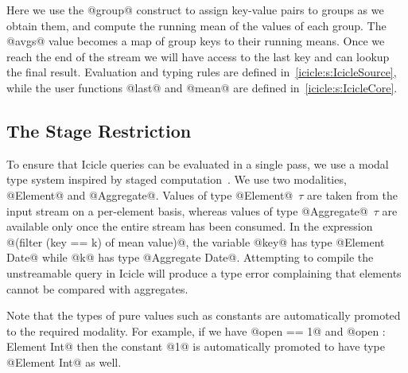 Here we use the @group@ construct to assign key-value pairs to groups as we obtain them, and compute the running mean of the values of each group. The @avgs@ value becomes a map of group keys to their running means. Once we reach the end of the stream we will have access to the last key and can lookup the final result.
Evaluation and typing rules are defined in~\cref{icicle:s:IcicleSource}, while the user functions @last@ and @mean@ are defined in~\cref{icicle:s:IcicleCore}.


\subsection{The Stage Restriction}
To ensure that Icicle queries can be evaluated in a single pass, we use a modal type system inspired by staged computation~\cite{davies2001modal}. We use two modalities, @Element@ and @Aggregate@. Values of type @Element@~$\tau$ are taken from the input stream on a per-element basis, whereas values of type @Aggregate@~$\tau$ are available only once the entire stream has been consumed. In the expression @(filter (key == k) of mean value)@, the variable @key@ has type @Element Date@ while @k@ has type @Aggregate Date@. Attempting to compile the unstreamable query in Icicle will produce a type error complaining that elements cannot be compared with aggregates.

Note that the types of pure values such as constants are automatically promoted to the required modality. For example, if we have @open == 1@ and @open : Element Int@ then the constant @1@ is automatically promoted to have type @Element Int@ as well.


